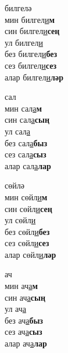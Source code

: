 \begin{multicols}{4}
\begin{enumerate}
\begin{minipage}{\linewidth}
    \item
    билгелә\\
    мин билгел\underline{и}\textbf{м}\\
    син билгел\underline{и}\textbf{сең}\\
    ул билгел\underline{и}\\
    без билгел\underline{и}\textbf{без}\\
    сез билгел\underline{и}\textbf{сез}\\
    алар билгел\underline{и}\textbf{ләр}\\
\end{minipage}

\begin{minipage}{\linewidth}
    \item
    сал\\
    мин сал\underline{а}\textbf{м}\\
    син сал\underline{а}\textbf{сың}\\
    ул сал\underline{а}\\
    без сал\underline{а}\textbf{быз}\\
    сез сал\underline{а}\textbf{сыз}\\
    алар сал\underline{а}\textbf{лар}\\
\end{minipage}

\begin{minipage}{\linewidth}
    \item
    сөйлә\\
    мин сөйл\underline{и}\textbf{м}\\
    син сөйл\underline{и}\textbf{сең}\\
    ул сөйл\underline{и}\\
    без сөйл\underline{и}\textbf{без}\\
    сез сөйл\underline{и}\textbf{сез}\\
    алар сөйл\underline{и}\textbf{ләр}\\
\end{minipage}

\begin{minipage}{\linewidth}
    \item
    ач\\
    мин ач\underline{а}\textbf{м}\\
    син ач\underline{а}\textbf{сың}\\
    ул ач\underline{а}\\
    без ач\underline{а}\textbf{быз}\\
    сез ач\underline{а}\textbf{сыз}\\
    алар ач\underline{а}\textbf{лар}\\
\end{minipage}


\end{enumerate}
\end{multicols}
